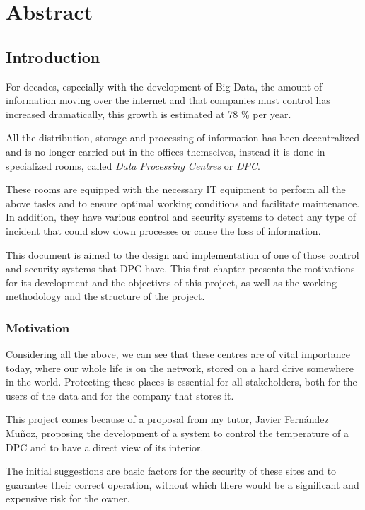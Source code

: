 \chapter{Abstract}\label{ch:abstract}
\section{Introduction}\label{sec:introduction}
For decades, especially with the development of Big Data, the amount of information moving over the internet and that companies must control has increased dramatically, this growth is estimated at 78 \% per year.

All the distribution, storage and processing of information has been decentralized and is no longer carried out in the offices themselves, instead it is done in specialized rooms, called \textit{Data Processing Centres} or \textit{DPC}.

These rooms are equipped with the necessary IT equipment to perform all the above tasks and to ensure optimal working conditions and facilitate maintenance. In addition, they have various control and security systems to detect any type of incident that could slow down processes or cause the loss of information.

This document is aimed to the design and implementation of one of those control and security systems that DPC have. This first chapter presents the motivations for its development and the objectives of this project, as well as the working methodology and the structure of the project.

\subsection{Motivation}\label{subsec:motivation}
Considering all the above, we can see that these centres are of vital importance today, where our whole life is on the network, stored on a hard drive somewhere in the world. Protecting these places is essential for all stakeholders, both for the users of the data and for the company that stores it.

This project comes because of a proposal from my tutor, Javier Fernández Muñoz, proposing the development of a system to control the temperature of a DPC and to have a direct view of its interior.

The initial suggestions are basic factors for the security of these sites and to guarantee their correct operation, without which there would be a significant and expensive risk for the owner.

